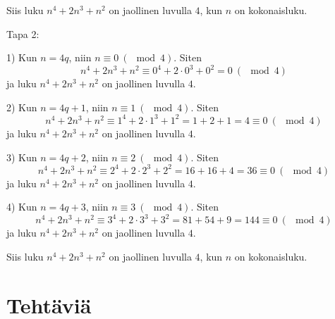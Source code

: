Siis luku $n^4 + 2n^3 + n^2$ on jaollinen luvulla $4$, kun $n$ on
kokonaisluku.

Tapa 2:

1) Kun $n = 4q$, niin $n\equiv0\ (\mod 4)$. Siten
\[
n^4 + 2n^3 + n^2 \equiv 0^4 + 2 \cdot 0^3 + 0^2 = 0\ (\mod 4)
\]
ja luku $n^4 + 2n^3 + n^2$ on jaollinen luvulla $4$.

2) Kun $n = 4q + 1$, niin $n \equiv 1\ (\mod 4)$. Siten
\[
n^4 + 2n^3 + n^2 \equiv 1^4 + 2 \cdot 1^3 + 1^2 = 1 + 2 + 1 = 4
\equiv 0\ (\mod 4)
\]
ja luku $n^4 + 2n^3 + n^2$ on jaollinen luvulla $4$.

3) Kun $n = 4q + 2$, niin $n \equiv 2\ (\mod 4)$. Siten
\[
n^4 + 2n^3 + n^2 \equiv 2^4 + 2 \cdot 2^3 + 2^2 = 16 + 16 + 4 =
36 \equiv 0\ (\mod 4)
\]
ja luku $n^4 + 2n^3 + n^2$ on jaollinen luvulla $4$.

4) Kun $n = 4q + 3$, niin $n \equiv 3\ (\mod 4)$. Siten
\[
n^4 + 2n^3 + n^2 \equiv 3^4 + 2 \cdot 3^3 + 3^2 = 81 + 54 + 9 =
144 \equiv 0\ (\mod 4)
\]
ja luku $n^4 + 2n^3 + n^2$ on jaollinen luvulla $4$.

Siis luku $n^4 + 2n^3 + n^2$ on jaollinen luvulla $4$, kun $n$ on
kokonaisluku.

\newpage


\section*{Tehtäviä}

